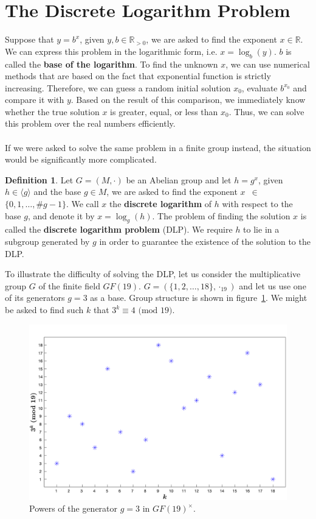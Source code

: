\documentclass[thesis=M,english]{FITthesis}[2012/10/20]
\theoremstyle{remark}
\theoremstyle{definition}
\newtheorem{DF}{Definition}[section]
\begin{document}
\section{The Discrete Logarithm Problem}
Suppose that $y = b^x$, given $y,b \in \mathbb{R}_{> 0}$, we are asked to find the exponent $x \in \mathbb{R}$. We can express this problem in the logarithmic form, i.e. $x = \log_b(y)$. $b$ is called the \textbf{base of the logarithm}. To find the unknown $x$, we can use numerical methods that are based on the fact that exponential function is strictly increasing. Therefore, we can guess a random initial solution $x_0$, evaluate $b^{x_0}$ and compare it with $y$. Based on the result of this comparison, we immediately know whether the true solution $x$ is greater, equal, or less than $x_0$. Thus, we can solve this problem over the real numbers efficiently.
\\
\\
\noindent If we were asked to solve the same problem in a finite group instead, the situation would be significantly more complicated.
\begin{DF}
Let $G = (M, \cdot)$ be an Abelian group and let $h = g^x$, given $h \in \langle g \rangle$ and the base $g \in M$, we are asked to find the exponent $x$~$\in$~$\{0,1, \ldots, \#g - 1\}.$ We call $x$ the \textbf{discrete logarithm} of $h$ with respect to the base $g$, and denote it by $x= \log_g(h)$. The problem of finding the solution $x$ is called the \textbf{discrete logarithm problem} (DLP). We require $h$ to lie in a subgroup generated by $g$ in order to guarantee the existence of the solution to the DLP. 
\end{DF}
\noindent To illustrate the difficulty of solving the DLP, let us consider the multiplicative group $G$ of the finite field $GF(19).$ $G = (\{1,2,\ldots,18\}, \cdot_{19})$ and let us use one of its generators $g=3$ as a base. Group structure is shown in figure~\ref{fig2}. We might be asked to find such $k$ that $3^k \equiv 4 \text{ (mod 19)}$. 
 \begin{figure}[h]
\hspace*{-2cm}
 	\includegraphics[width=1.25\textwidth]{graph3in19.png}
 	\caption[Example of the group structure of $GF(19)^\times$]{Powers of the generator $g = 3$ in $GF(19)^\times$.}
 	\label{fig2}
 \end{figure}
\end{document}
